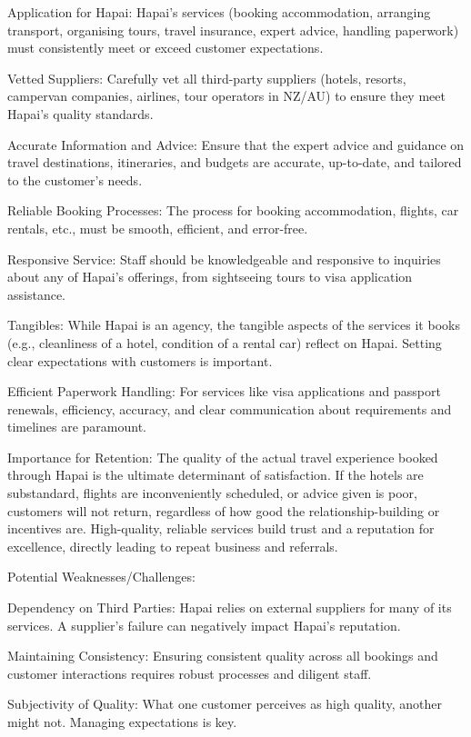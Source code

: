 \documentclass{article}
\begin{document}
Application for Hapai:
Hapai’s services (booking accommodation, arranging transport, organising tours, travel insurance, expert advice, handling paperwork) must consistently meet or exceed customer expectations.

Vetted Suppliers: Carefully vet all third-party suppliers (hotels, resorts, campervan companies, airlines, tour operators in NZ/AU) to ensure they meet Hapai's quality standards.

Accurate Information and Advice: Ensure that the expert advice and guidance on travel destinations, itineraries, and budgets are accurate, up-to-date, and tailored to the customer's needs.

Reliable Booking Processes: The process for booking accommodation, flights, car rentals, etc., must be smooth, efficient, and error-free.

Responsive Service: Staff should be knowledgeable and responsive to inquiries about any of Hapai's offerings, from sightseeing tours to visa application assistance.

Tangibles: While Hapai is an agency, the tangible aspects of the services it books (e.g., cleanliness of a hotel, condition of a rental car) reflect on Hapai. Setting clear expectations with customers is important.

Efficient Paperwork Handling: For services like visa applications and passport renewals, efficiency, accuracy, and clear communication about requirements and timelines are paramount.

Importance for Retention:
The quality of the actual travel experience booked through Hapai is the ultimate determinant of satisfaction. If the hotels are substandard, flights are inconveniently scheduled, or advice given is poor, customers will not return, regardless of how good the relationship-building or incentives are. High-quality, reliable services build trust and a reputation for excellence, directly leading to repeat business and referrals.

Potential Weaknesses/Challenges:

Dependency on Third Parties: Hapai relies on external suppliers for many of its services. A supplier's failure can negatively impact Hapai's reputation.

Maintaining Consistency: Ensuring consistent quality across all bookings and customer interactions requires robust processes and diligent staff.

Subjectivity of Quality: What one customer perceives as high quality, another might not. Managing expectations is key.
\end{document}
